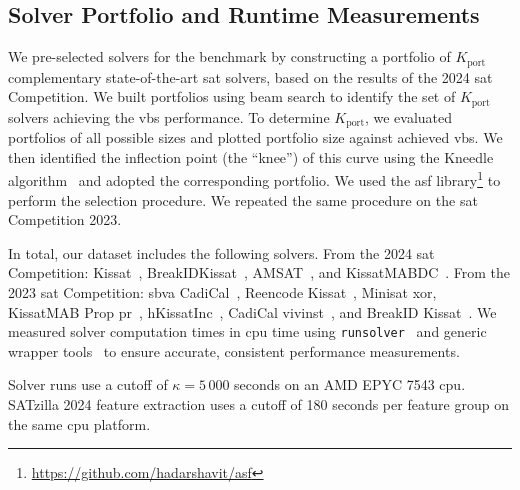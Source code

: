 \subsection{Solver Portfolio and Runtime Measurements}
We pre-selected solvers for the benchmark by constructing a portfolio of $K_{\mathrm{port}}$ complementary state-of-the-art \gls{sat} solvers, based on the results of the 2024 \gls{sat} Competition. We built portfolios using beam search to identify the set of $K_{\mathrm{port}}$ solvers achieving the \gls{vbs} performance. To determine $K_{\mathrm{port}}$, we evaluated portfolios of all possible sizes and plotted portfolio size against achieved \gls{vbs}. We then identified the inflection point (the ``knee'') of this curve using the Kneedle algorithm~\citep{SatEtAl11} and adopted the corresponding portfolio. We used the \gls{asf} library\footnote{\url{https://github.com/hadarshavit/asf}} to perform the selection procedure. We repeated the same procedure on the \gls{sat} Competition 2023.

In total, our dataset includes the following solvers. From the 2024 \gls{sat} Competition: Kissat~\citep{BieEtAl24}, BreakIDKissat~\citep{BogEtAl24}, AMSAT~\citep{LiEtAl24d}, and KissatMABDC~\citep{LiuEtAl24b}. From the 2023 \gls{sat} Competition: \gls{sbva} CadiCal~\citep{HabGre23}, Reencode Kissat~\citep{ReeBry23}, Minisat \gls{xor}, KissatMAB Prop \gls{pr}~\citep{Gao23}, hKissatInc~\citep{TchDja23}, CadiCal vivinst~\citep{BieEtAl23}, and BreakID Kissat~\citep{BogEtAl23}. We measured solver computation times in \gls{cpu} time using \texttt{runsolver}~\citep{Roussel11c} and generic wrapper tools~\citep{EggEtAl19} to ensure accurate, consistent performance measurements.

Solver runs use a cutoff of $\kappa=5\,000$ seconds on an AMD EPYC 7543 \gls{cpu}. SATzilla 2024 feature extraction uses a cutoff of 180 seconds per feature group on the same \gls{cpu} platform.


